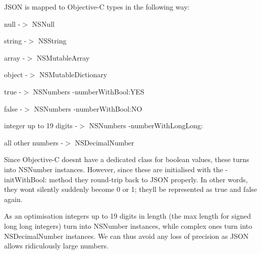 J\+S\+O\+N is mapped to Objective-\/\+C types in the following way\+:

\begin{DoxyItemize}
\item null -\/$>$ N\+S\+Null \item string -\/$>$ N\+S\+String \item array -\/$>$ N\+S\+Mutable\+Array \item object -\/$>$ N\+S\+Mutable\+Dictionary \item true -\/$>$ N\+S\+Number\textquotesingle{}s -\/number\+With\+Bool\+:Y\+E\+S \item false -\/$>$ N\+S\+Number\textquotesingle{}s -\/number\+With\+Bool\+:N\+O \item integer up to 19 digits -\/$>$ N\+S\+Number\textquotesingle{}s -\/number\+With\+Long\+Long\+: \item all other numbers -\/$>$ N\+S\+Decimal\+Number\end{DoxyItemize}
Since Objective-\/\+C doesn\textquotesingle{}t have a dedicated class for boolean values, these turns into N\+S\+Number instances. However, since these are initialised with the -\/init\+With\+Bool\+: method they round-\/trip back to J\+S\+O\+N properly. In other words, they won\textquotesingle{}t silently suddenly become 0 or 1; they\textquotesingle{}ll be represented as \textquotesingle{}true\textquotesingle{} and \textquotesingle{}false\textquotesingle{} again.

As an optimisation integers up to 19 digits in length (the max length for signed long long integers) turn into N\+S\+Number instances, while complex ones turn into N\+S\+Decimal\+Number instances. We can thus avoid any loss of precision as J\+S\+O\+N allows ridiculously large numbers. 